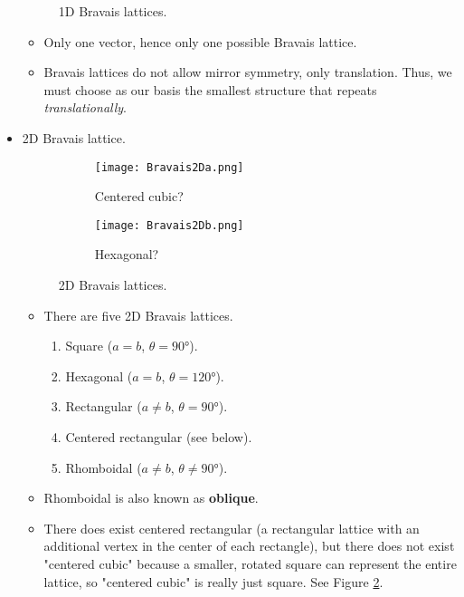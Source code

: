 \documentclass[../notes.tex]{subfiles}
\begin{document}
\begin{itemize}
\begin{figure}[h!]
        \caption{1D Bravais lattices.}
        \label{fig:Bravais1D}
    \end{figure}
    \begin{itemize}
        \item Only one vector, hence only one possible Bravais lattice.
        \item Bravais lattices do not allow mirror symmetry, only translation. Thus, we must choose as our basis the smallest structure that repeats \emph{translationally}.
    \end{itemize}
    \item 2D Bravais lattice.
    \begin{figure}[h!]
        \centering
        \begin{subfigure}[b]{0.4\linewidth}
            \centering
            \texttt{[image: Bravais2Da.png]}
            \caption{Centered cubic?}
            \label{fig:Bravais2Da}
        \end{subfigure}
        \begin{subfigure}[b]{0.4\linewidth}
            \centering
            \texttt{[image: Bravais2Db.png]}
            \caption{Hexagonal?}
            \label{fig:Bravais2Db}
        \end{subfigure}
        \caption{2D Bravais lattices.}
        \label{fig:Bravais2D}
    \end{figure}
    \begin{itemize}
        \item There are five 2D Bravais lattices.
        \begin{enumerate}
            \item Square ($a=b$, $\theta=\ang{90}$).
            \item Hexagonal ($a=b$, $\theta=\ang{120}$).
            \item Rectangular ($a\neq b$, $\theta=\ang{90}$).
            \item Centered rectangular (see below).
            \item Rhomboidal ($a\neq b$, $\theta\neq\ang{90}$).
        \end{enumerate}
        \item Rhomboidal is also known as \textbf{oblique}.
        \item There does exist centered rectangular (a rectangular lattice with an additional vertex in the center of each rectangle), but there does not exist "centered cubic" because a smaller, rotated square can represent the entire lattice, so "centered cubic" is really just square. See Figure \ref{fig:Bravais2Da}.

\end{itemize}
\end{itemize}
\end{document}
